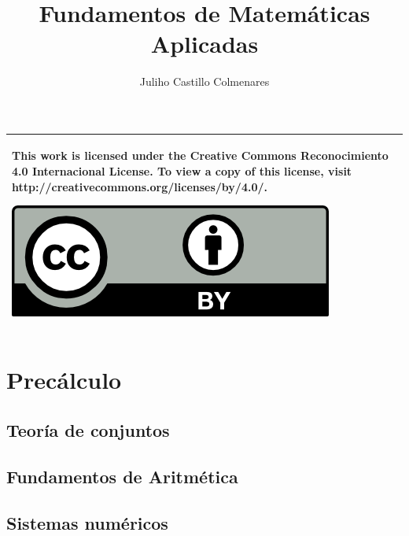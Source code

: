 \documentclass[
]{tufte-book}
\title{Fundamentos de Matemáticas Aplicadas}
\author{Juliho Castillo Colmenares}
\begin{document}
	\maketitle
\begin{tabular}{|p{}|}
	\hline
	This work is licensed under the Creative Commons Reconocimiento 4.0 Internacional License. To view a copy of this license, visit
	http://creativecommons.org/licenses/by/4.0/.
	\begin{center}
		\includegraphics[scale=1]{./licencia/by.png}
	\end{center}\\
	\hline
\end{tabular}
\tableofcontents


\part{Precálculo}

\chapter{Teoría de conjuntos}



 





 





\chapter{Fundamentos de Aritmética}







\chapter{Sistemas numéricos}




\end{document}
